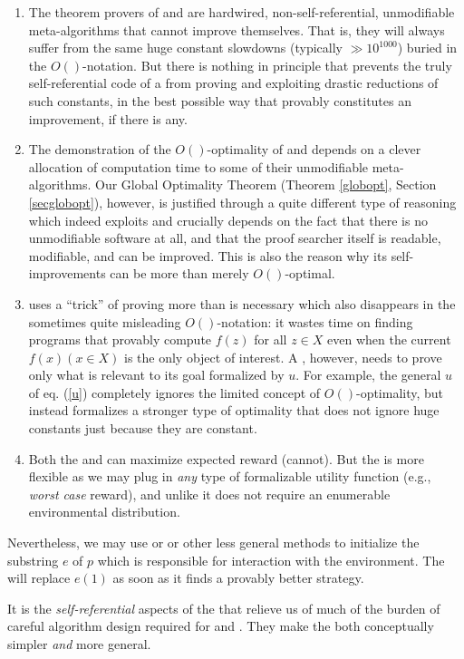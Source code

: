 \begin{enumerate}
\begin{enumerate}
\item 
The theorem provers  of \hs and \tl 
are hardwired, non-self-\-refe\-ren\-tial, unmodifiable meta-algorithms 
that cannot improve
themselves. That is, they will always suffer from the same 
huge constant slowdowns (typically $\gg 10^{1000}$)
buried in the $O()$-notation.
But there is nothing in principle that prevents the
truly self-referential code
of a \gm
from proving and exploiting drastic
reductions of such constants, in the best possible 
way that provably constitutes an improvement, if there is any. 
\item
The demonstration of the $O()$-optimality of \hs and \tl depends on 
a clever allocation of computation time to some of their unmodifiable meta-algorithms.
Our Global Optimality Theorem (Theorem \ref{globopt}, 
Section \ref{secglobopt}), however, is justified through
a quite different type of reasoning which indeed exploits and crucially depends
on the fact that there is no unmodifiable software at all,
and that the proof searcher itself is readable, modifiable,
and can be improved. 
This is also the reason why its self-improvements
can be more than merely $O()$-optimal.
\item
\hs uses a ``trick'' of proving more than is necessary
which also disappears in the sometimes quite misleading $O()$-notation: it
wastes time on finding programs that provably compute $f(z)$
for all $z \in X$ even when the current $f(x) (x \in X)$ is the only
object of interest. A \gmn, however, needs to prove only what is 
relevant to its goal formalized by $u$. For example, the 
general $u$ of eq. (\ref{u}) 
completely ignores the limited concept of $O()$-optimality, 
but instead formalizes a stronger type of optimality that does not ignore huge
constants just because they are constant.
\item
Both the \gm and \tl can maximize expected reward
(\hs cannot). But the \gm is more flexible
as we may plug in {\em any} type of formalizable utility function
(e.g., {\em worst case} reward),  and unlike \tl it does not
require an enumerable environmental distribution. 
\end{enumerate}
Nevertheless, we may 
use \tl or \hs or other less general methods
to initialize the
substring $e$ of $p$ which is
responsible for interaction with the environment.
The \gm will replace $e(1)$ as soon
as it finds a provably better strategy.

It is the {\em self-referential} aspects
of the \gm that relieve us of much of the burden of careful
algorithm design required for \tl and \hsn. They make the \gm both
conceptually simpler {\em and} more general.
\\


\end{enumerate}
